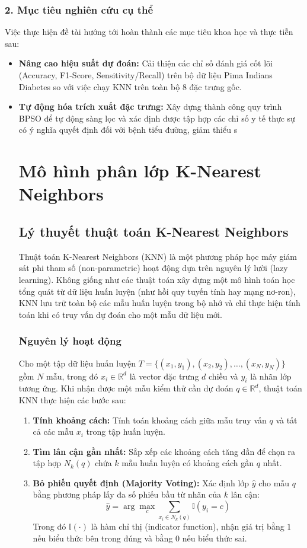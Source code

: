 \documentclass[a4paper,12pt]{report}
\begin{document}
\subsection*{2. Mục tiêu nghiên cứu cụ thể}
Việc thực hiện đề tài hướng tới hoàn thành các mục tiêu khoa học và thực tiễn sau:
\begin{itemize}
    \item \textbf{Nâng cao hiệu suất dự đoán:} Cải thiện các chỉ số đánh giá cốt lõi (Accuracy, F1-Score, Sensitivity/Recall) trên bộ dữ liệu Pima Indians Diabetes so với việc chạy KNN trên toàn bộ 8 đặc trưng gốc.
    \item \textbf{Tự động hóa trích xuất đặc trưng:} Xây dựng thành công quy trình BPSO để tự động sàng lọc và xác định được tập hợp các chỉ số y tế thực sự có ý nghĩa quyết định đối với bệnh tiểu đường, giảm thiểu s


\chapter{Mô hình phân lớp K-Nearest Neighbors}

\section{Lý thuyết thuật toán K-Nearest Neighbors}
Thuật toán K-Nearest Neighbors (KNN) là một phương pháp học máy giám sát phi tham số (non-parametric) hoạt động dựa trên nguyên lý lười (lazy learning). Không giống như các thuật toán xây dựng một mô hình toán học tổng quát từ dữ liệu huấn luyện (như hồi quy tuyến tính hay mạng nơ-ron), KNN lưu trữ toàn bộ các mẫu huấn luyện trong bộ nhớ và chỉ thực hiện tính toán khi có truy vấn dự đoán cho một mẫu dữ liệu mới.

\subsection{Nguyên lý hoạt động}
Cho một tập dữ liệu huấn luyện $T = \{(x_1, y_1), (x_2, y_2), \dots, (x_N, y_N)\}$ gồm $N$ mẫu, trong đó $x_i \in \mathbb{R}^d$ là vector đặc trưng $d$ chiều và $y_i$ là nhãn lớp tương ứng. Khi nhận được một mẫu kiểm thử cần dự đoán $q \in \mathbb{R}^d$, thuật toán KNN thực hiện các bước sau:
\begin{enumerate}
    \item \textbf{Tính khoảng cách:} Tính toán khoảng cách giữa mẫu truy vấn $q$ và tất cả các mẫu $x_i$ trong tập huấn luyện.
    \item \textbf{Tìm lân cận gần nhất:} Sắp xếp các khoảng cách tăng dần để chọn ra tập hợp $N_k(q)$ chứa $k$ mẫu huấn luyện có khoảng cách gần $q$ nhất.
    \item \textbf{Bỏ phiếu quyết định (Majority Voting):} Xác định lớp $\hat{y}$ cho mẫu $q$ bằng phương pháp lấy đa số phiếu bầu từ nhãn của $k$ lân cận:
    \begin{equation}
        \hat{y} = \arg\max_{c} \sum_{x_i \in N_k(q)} \mathbb{I}(y_i = c)
    \end{equation}
    Trong đó $\mathbb{I}(\cdot)$ là hàm chỉ thị (indicator function), nhận giá trị bằng $1$ nếu biểu thức bên trong đúng và bằng $0$ nếu biểu thức sai.
\end{enumerate}


\end{itemize}
\end{document}
